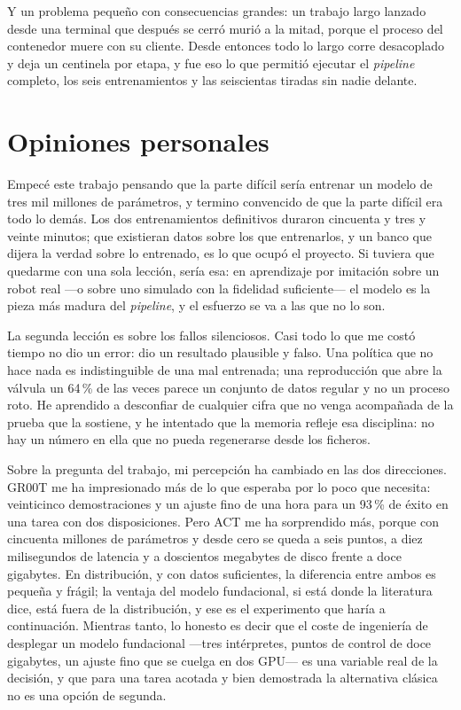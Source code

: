 Y un problema pequeño con consecuencias grandes: un trabajo largo lanzado desde una terminal que
después se cerró murió a la mitad, porque el proceso del contenedor muere con su cliente. Desde
entonces todo lo largo corre desacoplado y deja un centinela por etapa, y fue eso lo que permitió
ejecutar el \textit{pipeline} completo, los seis entrenamientos y las seiscientas tiradas sin nadie delante.


\section*{Opiniones personales}

Empecé este trabajo pensando que la parte difícil sería entrenar un modelo de tres mil millones de
parámetros, y termino convencido de que la parte difícil era todo lo demás. Los dos
entrenamientos definitivos duraron cincuenta y tres y veinte minutos; que existieran datos sobre
los que entrenarlos, y un banco que dijera la verdad sobre lo entrenado, es lo que ocupó el
proyecto. Si tuviera que quedarme con una sola lección, sería esa: en aprendizaje por imitación
sobre un robot real —o sobre uno simulado con la fidelidad suficiente— el modelo es la pieza más
madura del \textit{pipeline}, y el esfuerzo se va a las que no lo son.

La segunda lección es sobre los fallos silenciosos. Casi todo lo que me costó tiempo no dio un
error: dio un resultado plausible y falso. Una política que no hace nada es indistinguible de una
mal entrenada; una reproducción que abre la válvula un 64\,\% de las veces parece un conjunto de
datos regular y no un proceso roto. He aprendido a desconfiar de cualquier cifra que no venga
acompañada de la prueba que la sostiene, y he intentado que la memoria refleje esa disciplina: no
hay un número en ella que no pueda regenerarse desde los ficheros.

Sobre la pregunta del trabajo, mi percepción ha cambiado en las dos direcciones. GR00T me ha
impresionado más de lo que esperaba por lo poco que necesita: veinticinco demostraciones y un
ajuste fino de una hora para un 93\,\% de éxito en una tarea con dos disposiciones. Pero ACT me ha
sorprendido más, porque con cincuenta millones de parámetros y desde cero se queda a seis puntos, a
diez milisegundos de latencia y a doscientos megabytes de disco frente a doce gigabytes. En
distribución, y con datos suficientes, la diferencia entre ambos es pequeña y frágil; la ventaja
del modelo fundacional, si está donde la literatura dice, está fuera de la distribución, y ese es
el experimento que haría a continuación. Mientras tanto, lo honesto es decir que el coste de
ingeniería de desplegar un modelo fundacional —tres intérpretes, puntos de control de doce
gigabytes, un ajuste fino que se cuelga en dos GPU— es una variable real de la decisión, y que
para una tarea acotada y bien demostrada la alternativa clásica no es una opción de segunda.


